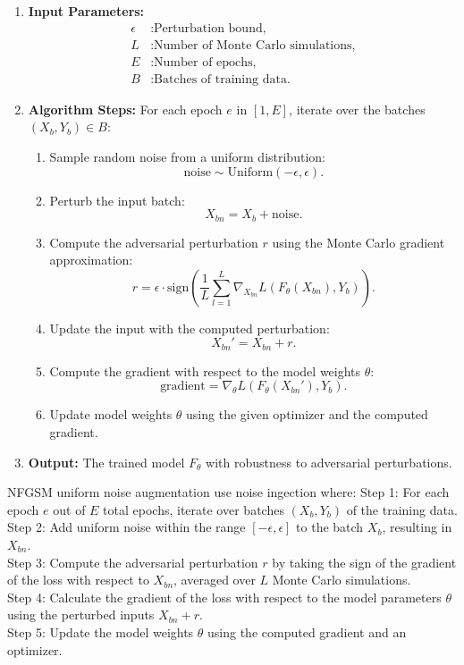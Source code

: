 \begin{enumerate}
    \item \textbf{Input Parameters:}
    \begin{align*}
    \epsilon &: \text{Perturbation bound,} \\
    L &: \text{Number of Monte Carlo simulations,} \\
    E &: \text{Number of epochs,} \\
    B &: \text{Batches of training data.}
    \end{align*}

    \item \textbf{Algorithm Steps:}
    For each epoch $e$ in $[1, E]$, iterate over the batches $(X_b, Y_b) \in B$:
    \begin{enumerate}
        \item Sample random noise from a uniform distribution:
        \[
        \text{noise} \sim \text{Uniform}(-\epsilon, \epsilon).
        \]
        \item Perturb the input batch:
        \[
        X_{bn} = X_b + \text{noise}.
        \]
        \item Compute the adversarial perturbation $r$ using the Monte Carlo gradient approximation:
        \[
        r = \epsilon \cdot \text{sign}\left( \frac{1}{L} \sum_{l=1}^L \nabla_{X_{bn}} L(F_\theta(X_{bn}), Y_b) \right).
        \]
        \item Update the input with the computed perturbation:
        \[
        X_{bn}' = X_{bn} + r.
        \]
        \item Compute the gradient with respect to the model weights $\theta$:
        \[
        \text{gradient} = \nabla_{\theta} L(F_\theta(X_{bn}'), Y_b).
        \]
        \item Update model weights $\theta$ using the given optimizer and the computed gradient.
    \end{enumerate}

    \item \textbf{Output:} The trained model $F_\theta$ with robustness to adversarial perturbations.
\end{enumerate}

NFGSM uniform noise augmentation use noise ingection where:
Step 1: For each epoch $e$ out of $E$ total epochs, iterate over batches $(X_b, Y_b)$ of the training data. \\
Step 2: Add uniform noise within the range $[- \epsilon, \epsilon]$ to the batch $X_b$, resulting in $X_{bn}$.\\
Step 3: Compute the adversarial perturbation $r$ by taking the sign of the gradient of the loss with respect to $X_{bn}$, averaged over $L$ Monte Carlo simulations. \\
Step 4: Calculate the gradient of the loss with respect to the model parameters $\theta$ using the perturbed inputs $X_{bn} + r$. \\
Step 5: Update the model weights $\theta$ using the computed gradient and an optimizer.